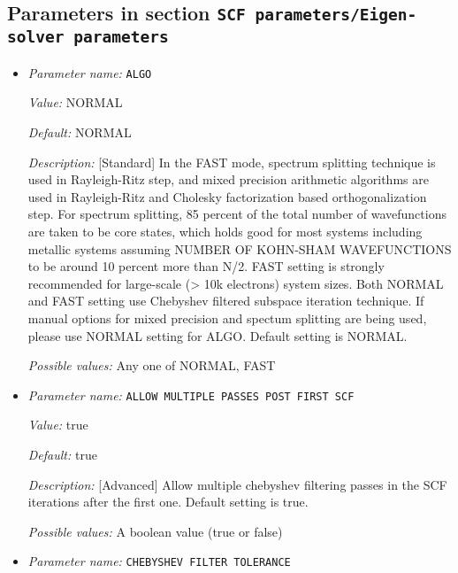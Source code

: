 \subsection{Parameters in section \tt SCF parameters/Eigen-solver parameters}
\label{parameters:SCF_20parameters/Eigen_2dsolver_20parameters}

\begin{itemize}
\item {\it Parameter name:} {\tt ALGO}
\label{parameters:SCF parameters/Eigen_2dsolver parameters/ALGO}
\label{parameters:SCF_20parameters/Eigen_2dsolver_20parameters/ALGO}


{\it Value:} NORMAL


{\it Default:} NORMAL


{\it Description:} [Standard] In the FAST mode, spectrum splitting technique is used in Rayleigh-Ritz step, and mixed precision arithmetic algorithms are used in Rayleigh-Ritz and Cholesky factorization based orthogonalization step. For spectrum splitting, 85 percent of the total number of wavefunctions are taken to be core states, which holds good for most systems including metallic systems assuming NUMBER OF KOHN-SHAM WAVEFUNCTIONS to be around 10 percent more than N/2. FAST setting is strongly recommended for large-scale (> 10k electrons) system sizes. Both NORMAL and FAST setting use Chebyshev filtered subspace iteration technique. If manual options for mixed precision and spectum splitting are being used, please use NORMAL setting for ALGO. Default setting is NORMAL.


{\it Possible values:} Any one of NORMAL, FAST
\item {\it Parameter name:} {\tt ALLOW MULTIPLE PASSES POST FIRST SCF}
\label{parameters:SCF parameters/Eigen_2dsolver parameters/ALLOW MULTIPLE PASSES POST FIRST SCF}
\label{parameters:SCF_20parameters/Eigen_2dsolver_20parameters/ALLOW_20MULTIPLE_20PASSES_20POST_20FIRST_20SCF}


{\it Value:} true


{\it Default:} true


{\it Description:} [Advanced] Allow multiple chebyshev filtering passes in the SCF iterations after the first one. Default setting is true.


{\it Possible values:} A boolean value (true or false)
\item {\it Parameter name:} {\tt CHEBYSHEV FILTER TOLERANCE}
\label{parameters:SCF parameters/Eigen_2dsolver parameters/CHEBYSHEV FILTER TOLERANCE}
\label{parameters:SCF_20parameters/Eigen_2dsolver_20parameters/CHEBYSHEV_20FILTER_20TOLERANCE}



\end{itemize}
